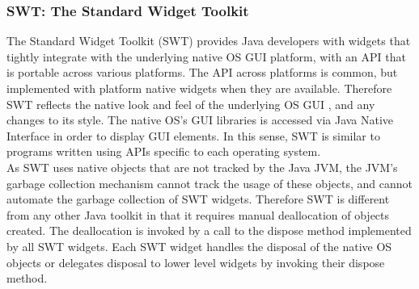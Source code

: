 \subsubsection{SWT: The Standard Widget Toolkit}
The Standard Widget Toolkit (SWT) provides Java developers with widgets that tightly integrate with the underlying native OS GUI platform, with an API that is portable across various platforms. The API across platforms is common, but implemented with platform native widgets when they are available. Therefore SWT reflects the native look and feel of the underlying OS GUI \cite{swt}, and any changes to its style. The native OS's GUI libraries is accessed via Java Native Interface in order to display GUI elements. In this sense, SWT is similar to programs written using APIs specific to each operating system.\\
As SWT uses native objects that are not tracked by the Java JVM, the JVM's garbage collection mechanism cannot track the usage of these objects, and cannot automate the garbage collection of SWT widgets. Therefore SWT is different from any other Java toolkit in that it requires manual deallocation of objects created. The deallocation is invoked by a call to the dispose method implemented by all SWT widgets. \cite{swtwidget} Each SWT widget handles the disposal of the native OS objects or delegates disposal to lower level widgets by invoking their dispose method.\\

